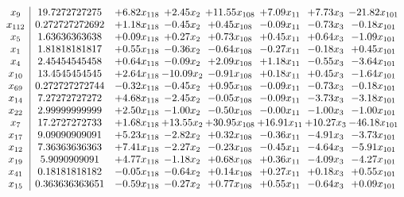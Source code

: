\documentclass[8pt]{article}
\begin{document}
\[\begin{array}{c| c c@{\hskip 2pt} c@{\hskip 2pt} c@{\hskip 2pt} c@{\hskip 2pt} c@{\hskip 2pt} c@{\hskip 2pt} }
 x_{9}   &  19.7272727275 & +  6.82 x_{118} & +  2.45 x_{2} & + 11.55 x_{108} & +  7.09 x_{11} & +  7.73 x_{3} & -21.82 x_{101}\\
 x_{112}   &  0.272727272692 & +  1.18 x_{118} & -0.45 x_{2} & +  0.45 x_{108} & -0.09 x_{11} & -0.73 x_{3} & -0.18 x_{101}\\
 x_{5}   &  1.63636363638 & +  0.09 x_{118} & +  0.27 x_{2} & +  0.73 x_{108} & +  0.45 x_{11} & +  0.64 x_{3} & -1.09 x_{101}\\
 x_{1}   &  1.81818181817 & +  0.55 x_{118} & -0.36 x_{2} & -0.64 x_{108} & -0.27 x_{11} & -0.18 x_{3} & +  0.45 x_{101}\\
 x_{4}   &  2.45454545458 & +  0.64 x_{118} & -0.09 x_{2} & +  2.09 x_{108} & +  1.18 x_{11} & -0.55 x_{3} & -3.64 x_{101}\\
 x_{10}   &  13.4545454545 & +  2.64 x_{118} & -10.09 x_{2} & -0.91 x_{108} & +  0.18 x_{11} & +  0.45 x_{3} & -1.64 x_{101}\\
 x_{69}   &  0.272727272744 & -0.32 x_{118} & -0.45 x_{2} & +  0.95 x_{108} & -0.09 x_{11} & -0.73 x_{3} & -0.18 x_{101}\\
 x_{14}   &  7.27272727272 & +  4.68 x_{118} & -2.45 x_{2} & -0.05 x_{108} & -0.09 x_{11} & -3.73 x_{3} & -3.18 x_{101}\\
 x_{22}   &  2.99999999999 & +  2.50 x_{118} & -1.00 x_{2} & -0.50 x_{108} & -0.00 x_{11} & -1.00 x_{3} & -1.00 x_{101}\\
 x_{7}   &  17.2727272733 & +  1.68 x_{118} & + 13.55 x_{2} & + 30.95 x_{108} & + 16.91 x_{11} & + 10.27 x_{3} & -46.18 x_{101}\\
 x_{17}   &  9.09090909091 & +  5.23 x_{118} & -2.82 x_{2} & +  0.32 x_{108} & -0.36 x_{11} & -4.91 x_{3} & -3.73 x_{101}\\
 x_{12}   &  7.36363636363 & +  7.41 x_{118} & -2.27 x_{2} & -0.23 x_{108} & -0.45 x_{11} & -4.64 x_{3} & -5.91 x_{101}\\
 x_{19}   &  5.9090909091 & +  4.77 x_{118} & -1.18 x_{2} & +  0.68 x_{108} & +  0.36 x_{11} & -4.09 x_{3} & -4.27 x_{101}\\
 x_{41}   &  0.18181818182 & -0.05 x_{118} & -0.64 x_{2} & +  0.14 x_{108} & +  0.27 x_{11} & +  0.18 x_{3} & +  0.55 x_{101}\\
 x_{15}   &  0.363636363651 & -0.59 x_{118} & -0.27 x_{2} & +  0.77 x_{108} & +  0.55 x_{11} & -0.64 x_{3} & +  0.09 x_{101}\\

\end{array}\]
\end{document}
